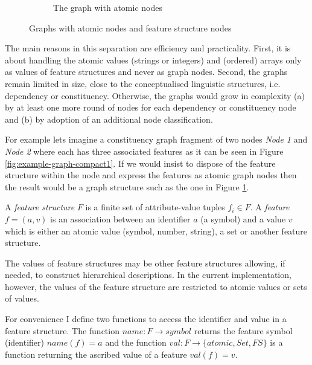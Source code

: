 \begin{figure}[!ht]
\begin{subfigure}[b]{0.5\textwidth}
        \caption{The graph with atomic nodes}
        \label{fig:example-graph-compact2}
    \end{subfigure}%
    \caption{Graphs with atomic nodes and feature structure nodes}
    \label{fig:example-graph-compact}
\end{figure}

The main reasons in this separation are efficiency and practicality. First, it is about handling the atomic values (strings or integers) and (ordered) arrays only as values of feature structures and never as graph nodes. Second, the graphs remain limited in size, close to the conceptualised linguistic structures, i.e. dependency or constituency. Otherwise, the graphs would grow in complexity (a) by at least one more round of nodes for each dependency or constituency node and (b) by adoption of an additional node classification.

For example lets imagine a constituency graph fragment of two nodes \textit{Node 1} and \textit{Node 2} where each has three associated features as it can be seen in Figure \ref{fig:example-graph-compact1}. If we would insist to dispose of the feature structure within the node and express the features as atomic graph nodes then the result would be a graph structure such as the one in Figure \ref{fig:example-graph-compact2}.

\begin{definition}\label{def:fs}
	A \textit{feature structure} $F$ is a finite set of attribute-value tuples $f_{i} \in F$. A \textit{feature} $f=(a,v)$ is an association between an identifier $a$ (a symbol) and a value $v$ which is either an atomic value (symbol, number, string), a set or another feature structure. 
\end{definition}

The values of feature structures may be other feature structures allowing, if needed, to construct hierarchical descriptions. In the current implementation, however, the values of the feature structure are restricted to atomic values or sets of values.

For convenience I define two functions to access the identifier and value in a feature structure. The function $name:F \rightarrow symbol$ returns the feature symbol (identifier) $name(f)=a$ and the function $val:F \rightarrow \{atomic, Set, FS\}$ is a function returning the ascribed value of a feature $val(f)=v$. 

